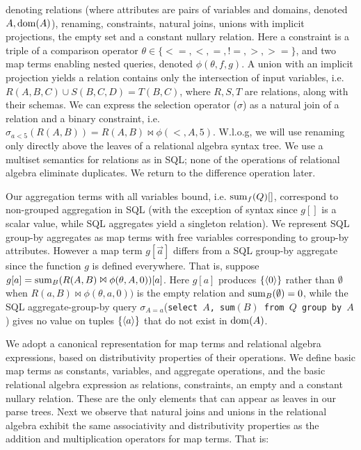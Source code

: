denoting relations (where attributes are pairs of variables and domains, denoted
$A, \mathrm{dom}(A)$), renaming, constraints, natural joins, unions with implicit
projections, the empty set and a constant nullary relation. Here a constraint is
a triple of a comparison operator $\theta \in \{<=,<,=,!=,>,>=\}$, and two map
terms enabling nested queries, denoted $\phi(\theta, f, g)$. A union with an
implicit projection yields a relation contains only the intersection of input
variables, i.e. $R(A,B,C) \cup S(B,C,D) = T(B,C)$, where $R,S,T$ are relations,
along with their schemas. We can express the selection operator ($\sigma$) as a
natural join of a relation and a binary constraint, i.e.  $\sigma_{a<5}(R(A,B))
= R(A,B) \Join \phi(<,A,5)$.  W.l.o.g, we will use renaming only directly above
the leaves of a relational algebra syntax tree.  We use a multiset semantics for
relations as in SQL; none of the operations of relational algebra eliminate
duplicates.  We return to the difference operation later.


Our aggregation terms with all variables bound, i.e. $\mathrm{sum}_{f}(Q)[]$,
correspond to non-grouped aggregation in SQL (with the exception of syntax since
$g[]$ is a scalar value, while SQL aggregates yield a singleton relation).  We
represent SQL group-by aggregates as map terms with free variables corresponding
to group-by attributes. However a map term $g[\vec{a}]$
differs from a SQL group-by aggregate since the function $g$ is defined everywhere.
That is, suppose $g[a] = \mathrm{sum}_{B}(R(A,B) \Join \phi(\theta,A,0))[a]$. Here $g[a]$
produces $\{{\langle0\rangle}\}$ rather than $\emptyset$ when
$R(a,B) \Join \phi(\theta,a,0))$ is the empty relation and
$\mathrm{sum}_{B}(\emptyset) = 0$, while the SQL aggregate-group-by query
$\sigma_{A=a}$(\texttt{select $A$, sum$(B)$ from $Q$ group by $A$})
gives no value on tuples $\{{\langle a\rangle}\}$ that do not exist in $\mathrm{dom}(A)$.


We adopt a canonical representation for map terms and relational algebra
expressions, based on distributivity properties of their operations. We define
basic map terms as constants, variables, and aggregate operations, and the basic
relational algebra expression as relations, constraints, an empty and a constant
nullary relation. These are the only elements that can appear as leaves in our
parse trees. Next we observe that natural joins and unions in the relational
algebra exhibit the same associativity and distributivity properties as the
addition and multiplication operators for map terms. That is:

